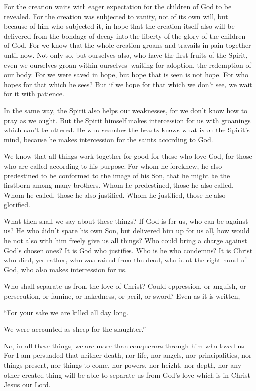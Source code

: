 {For the creation waits with eager expectation for the children of God to be revealed.
For the creation was subjected to vanity, not of its own will, but because of him who subjected it, in hope
that the creation itself also will be delivered from the bondage of decay into the liberty of the glory of the children of God.
For we know that the whole creation groans and travails in pain together until now.
Not only so, but ourselves also, who have the first fruits of the Spirit, even we ourselves groan within ourselves, waiting for adoption, the redemption of our body.
For we were saved in hope, but hope that is seen is not hope. For who hopes for that which he sees?
But if we hope for that which we don’t see, we wait for it with patience.
\par }{\PP {}In the same way, the Spirit also helps our weaknesses, for we don’t know how to pray as we ought. But the Spirit himself makes intercession for us with groanings which can’t be uttered.
He who searches the hearts knows what is on the Spirit’s mind, because he makes intercession for the saints according to God.
\par }{\PP {}We know that all things work together for good for those who love God, for those who are called according to his purpose.
For whom he foreknew, he also predestined to be conformed to the image of his Son, that he might be the firstborn among many brothers.
Whom he predestined, those he also called. Whom he called, those he also justified. Whom he justified, those he also glorified.
\par }{\PP {}What then shall we say about these things? If God is for us, who can be against us?
He who didn’t spare his own Son, but delivered him up for us all, how would he not also with him freely give us all things?
Who could bring a charge against God’s chosen ones? It is God who justifies.
Who is he who condemns? It is Christ who died, yes rather, who was raised from the dead, who is at the right hand of God, who also makes intercession for us.
\par }{\PP {}Who shall separate us from the love of Christ? Could oppression, or anguish, or persecution, or famine, or nakedness, or peril, or sword?
Even as it is written,
\par }{\Q “For your sake we are killed all day long.
\par }{\QB We were accounted as sheep for the slaughter.”
\par }{\MM {}No, in all these things, we are more than conquerors through him who loved us.
For I am persuaded that neither death, nor life, nor angels, nor principalities, nor things present, nor things to come, nor powers,
nor height, nor depth, nor any other created thing will be able to separate us from God’s love which is in Christ Jesus our Lord.

}

